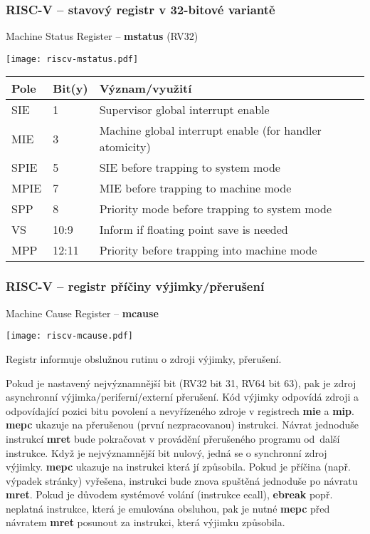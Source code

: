 \documentclass{beamer}
\begin{document}
\begin{frame}
\frametitle{RISC-V -- stavový registr v 32-bitové variantě}

Machine Status Register -- \textbf{mstatus} (RV32)

\begin{center}
  \texttt{[image: riscv-mstatus.pdf]}
\end{center}

\begin{tabular}{|l|l|l|}  \hline
Pole & Bit(y) & Význam/využití \\\hline
SIE & 1 & Supervisor global interrupt enable \\\hline
MIE & 3 & Machine global interrupt enable (for handler atomicity) \\\hline
SPIE & 5 & SIE before trapping to system mode \\\hline
MPIE & 7 & MIE before trapping to machine mode \\\hline
SPP & 8 & Priority mode before trapping to system mode \\\hline
VS & 10:9 & Inform if floating point save is needed \\\hline
MPP & 12:11 & Priority before trapping into machine mode \\\hline
\end{tabular}
\end{frame}

\begin{frame}
\frametitle{RISC-V -- registr příčiny výjimky/přerušení}

Machine Cause Register -- \textbf{mcause}

\begin{center}
  \texttt{[image: riscv-mcause.pdf]}
\end{center}

\small
Registr informuje obslužnou rutinu o zdroji výjimky, přerušení.

Pokud je nastavený nejvýznamnější bit (RV32 bit 31, RV64 bit 63), pak je zdroj
asynchronní výjimka/periferní/externí přerušení. Kód výjimky odpovídá
zdroji a odpovídající pozici bitu povolení a nevyřízeného zdroje v registrech
\textbf{mie} a \textbf{mip}. \textbf{mepc} ukazuje na přerušenou (první nezpracovanou)
instrukci. Návrat jednoduše instrukcí \textbf{mret} bude pokračovat v provádění přerušeného
programu od~další instrukce. Když je nejvýznamnější bit nulový, jedná se o synchronní zdroj výjimky.
\textbf{mepc} ukazuje na instrukci která jí způsobila. Pokud je příčina
(např. výpadek stránky) vyřešena, instrukci bude znova spuštěná jednoduše
po návratu \textbf{mret}. Pokud je důvodem systémové volání (instrukce ecall), \textbf{ebreak} popř.
neplatná instrukce, která je emulována obsluhou, pak je nutné \textbf{mepc} před návratem \textbf{mret}
posunout za instrukci, která výjimku způsobila.


\end{frame}
\end{document}

